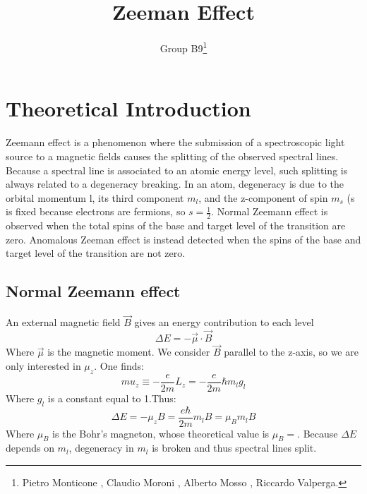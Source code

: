 \documentclass[a4paper,12pt,abstracton]{scrartcl}
\title{Zeeman Effect}
\author{Group B9\footnote{Pietro Monticone , Claudio Moroni , Alberto Mosso , Riccardo Valperga.}}
\begin{document}
\section{Theoretical Introduction}\label{ThIntro}
Zeemann effect is a phenomenon where the submission of a spectroscopic light source to a magnetic fields causes the splitting of the observed spectral lines. Because a spectral line is associated to an atomic energy level, such splitting is always related to a degeneracy breaking. In an atom, degeneracy is due to the orbital momentum l, its third component $m_l$, and the z-component of spin $m_s$ (s is fixed  because electrons are fermions, so $s=\frac{1}{2}$.\newline
Normal Zeemann effect is observed when the total spins of the base and target level of the transition are zero.
Anomalous Zeeman effect is instead detected when the spins of the base and target level of the transition are not zero.
\subsection{Normal Zeemann effect}
An external magnetic field $\vec{B}$ gives an energy contribution to each level
\begin{equation}
\Delta E = - \vec{\mu} \cdot \vec{B}
\end{equation}
Where $\vec{\mu}$ is the magnetic moment. We consider $\vec{B}$ parallel to the z-axis, so we are only interested in $\mu_z$. One finds: 
\begin{equation}
mu_z \equiv -\frac{e}{2m}L_z = -\frac{e}{2m}\hbar m_lg_l
\end{equation}
Where $g_l$ is a constant equal to 1.Thus:
\begin{equation}
\Delta E = - \mu_z B = \frac{e \hbar}{2m} m_l B = \mu_B m_l B
\end{equation}
Where $\mu_B$ is the Bohr's magneton, whose theoretical value is
$\mu_B = $. Because $\Delta E$ depends on $m_l$, degeneracy in $m_l$ is broken and thus spectral lines split.
\end{document}
